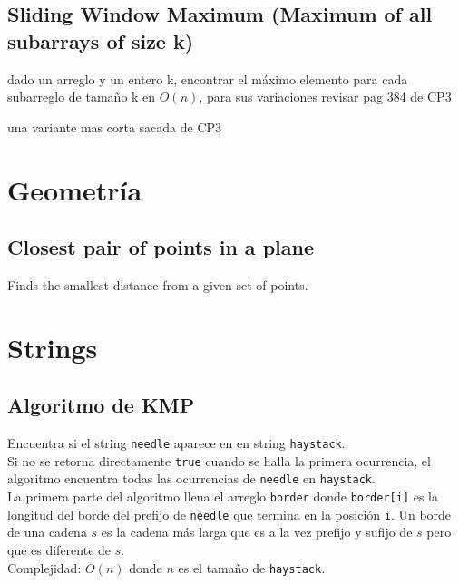 \documentclass[10pt,letterpaper]{article}
\newcommand{\source}[1]{
  
  \dotfill
}
\begin{document}
    \subsection{Sliding Window Maximum (Maximum of all subarrays of size k)}
    dado un arreglo y un entero k, encontrar el máximo elemento para cada subarreglo de tamaño k en $O(n)$, para sus variaciones revisar pag 384 de CP3
    
    \source{./src/SlidingWindowGeeks.cpp}

una variante mas corta sacada de CP3
	\source{./src/SlidingWindowCP3.cpp}

\section{Geometría}
  \subsection{Closest pair of points in a plane}
    Finds the smallest distance from a given set of points.
    \source{./src/closest_pair_points.cpp}

\section{Strings}
  \subsection{Algoritmo de KMP}
    Encuentra si el string \verb|needle| aparece en en string \verb|haystack|.\\
    Si no se retorna directamente \verb|true| cuando se halla la primera ocurrencia, el algoritmo encuentra todas las ocurrencias de \verb|needle| en \verb|haystack|.\\
    La primera parte del algoritmo llena el arreglo \verb|border| donde \verb|border[i]| es la longitud del borde del prefijo de \verb|needle| que termina en la posición \verb|i|. Un borde de una cadena $s$ es la cadena más larga que es a la vez prefijo y sufijo de $s$ pero que es diferente de $s$.\\
    Complejidad: $O(n)$ donde $n$ es el tamaño de \verb|haystack|.\\
    \source{./src/kmp.cpp}
\end{document}
